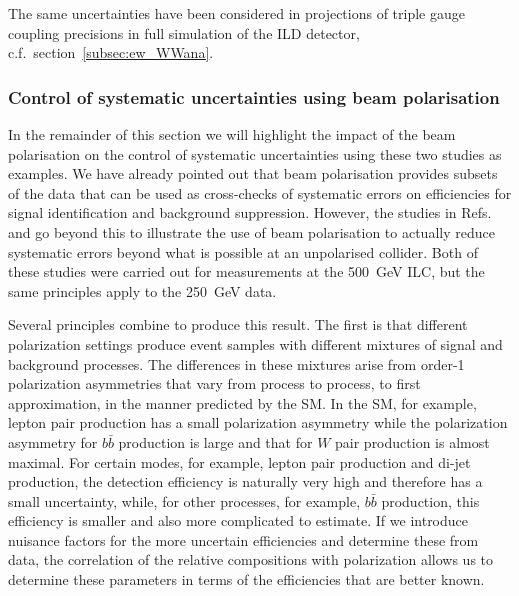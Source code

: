 \begin{itemize}

The same uncertainties have been considered in projections of triple gauge coupling precisions in full simulation of the ILD detector, c.f.\ section~\ref{subsec:ew_WWana}.

\end{itemize}



\subsubsection{Control of systematic uncertainties using beam polarisation} 
\label{subsubsec:pol:systematics}

In the remainder of this section we will highlight the impact of the beam polarisation on the control of systematic uncertainties using these two studies as examples.   We have already pointed out that beam polarisation provides subsets of the data that can be used as cross-checks of systematic errors on 
efficiencies for signal identification and background suppression.  However, the studies
in Refs.~\cite{bib:PhDRobert} and \cite{Habermehl:417605} go beyond this to illustrate the use of beam polarisation to actually reduce systematic errors beyond what is possible at 
an unpolarised collider.   Both of these studies were carried out for measurements at the 
500~GeV ILC, but the same principles apply to the 250~GeV data.

Several principles combine to produce this  result.   The first is that different polarization
settings produce event samples with different mixtures of signal and background 
processes.   The differences in these  mixtures arise from order-1 polarization asymmetries that vary from 
process to process, to first approximation, in the manner predicted by the SM.   In the SM, for example, lepton pair production has a small polarization asymmetry while the   polarization asymmetry for $b\bar b $ production is large and that for $W$ pair production is almost maximal.   For certain modes, for example, lepton pair production and di-jet production, the detection  efficiency is naturally very high and therefore has a small uncertainty, while, for other processes, for example, $b\bar b$ production, this efficiency is smaller and also more complicated to estimate.  If we introduce nuisance factors for the more uncertain efficiencies
and determine these from data, the correlation of the relative compositions with polarization
allows us to determine these parameters in terms of the efficiencies that are better known. 

